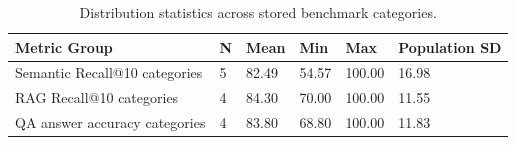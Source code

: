 \begin{table}[ht]
\centering
\caption{Distribution statistics across stored benchmark categories.}
\label{tab:category\_distribution\_statistics}
\begin{tabular}{llllll}
\hline
Metric Group & N & Mean & Min & Max & Population SD \\
\hline
Semantic Recall@10 categories & 5 & 82.49 & 54.57 & 100.00 & 16.98 \\
RAG Recall@10 categories & 4 & 84.30 & 70.00 & 100.00 & 11.55 \\
QA answer accuracy categories & 4 & 83.80 & 68.80 & 100.00 & 11.83 \\
\hline
\end{tabular}
\end{table}
